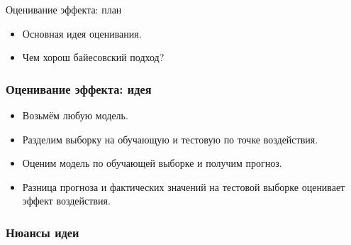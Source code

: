 
\begin{frame} %


\end{frame}



\begin{frame}{Оценивание эффекта: план}
  \begin{itemize}[<+->]
    \item Основная \alert{идея} оценивания.
    \item Чем хорош \alert{байесовский подход}?
  \end{itemize}

\end{frame}


\begin{frame}
  \frametitle{Оценивание эффекта: идея}

  \begin{itemize}[<+->]
    \item Возьмём \alert{любую} модель. 
    
    \item Разделим выборку на обучающую и тестовую \alert{по точке 
    воздействия}. 
    \item Оценим модель по обучающей выборке и \alert{получим прогноз}.
    \item \alert{Разница} прогноза и фактических значений на тестовой выборке 
    оценивает эффект воздействия.  
  \end{itemize}

\end{frame}


\begin{frame}
  \frametitle{Нюансы идеи}

  \begin{itemize}


    

\end{itemize}

\end{frame}


